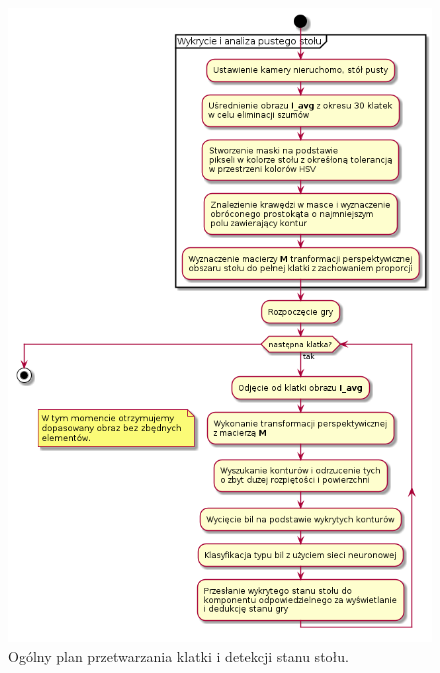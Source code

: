 \documentclass[12pt]{article}
\begin{document}
\newpage
\begin{figure}[H]
    \centering
    \includegraphics[width=14cm]{./diagrams/out/video_pipe.png}
    \caption{Ogólny plan przetwarzania klatki i detekcji stanu stołu.}
    \label{}
\end{figure}
\end{document}
